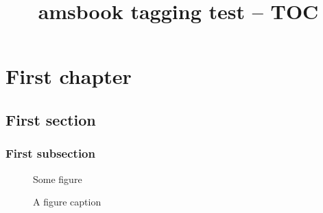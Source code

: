 \documentclass{amsbook}
\title{amsbook tagging test -- TOC}
\begin{document}
\tableofcontents
\listoffigures

\chapter{First chapter}
\section{First section}
\subsection{First subsection}
\begin{figure}
Some figure
\caption{A figure caption}
\end{figure}
\end{document}
